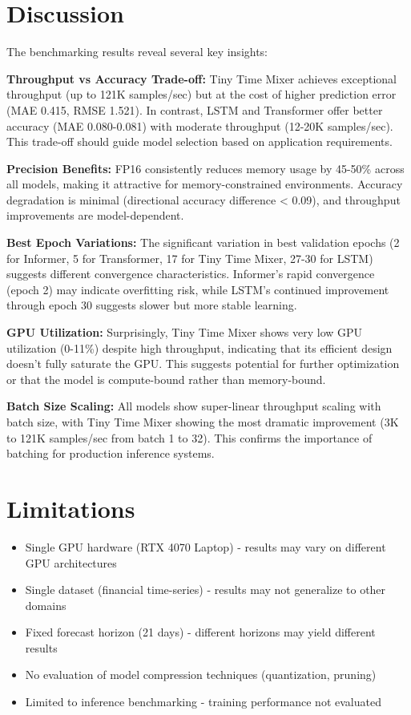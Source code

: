 \documentclass[10pt,a4paper]{article}
\begin{document}
\section{Discussion}
The benchmarking results reveal several key insights:

\textbf{Throughput vs Accuracy Trade-off:} Tiny Time Mixer achieves exceptional throughput (up to 121K samples/sec) but at the cost of higher prediction error (MAE 0.415, RMSE 1.521). In contrast, LSTM and Transformer offer better accuracy (MAE 0.080-0.081) with moderate throughput (12-20K samples/sec). This trade-off should guide model selection based on application requirements.

\textbf{Precision Benefits:} FP16 consistently reduces memory usage by 45-50\% across all models, making it attractive for memory-constrained environments. Accuracy degradation is minimal (directional accuracy difference < 0.09), and throughput improvements are model-dependent.

\textbf{Best Epoch Variations:} The significant variation in best validation epochs (2 for Informer, 5 for Transformer, 17 for Tiny Time Mixer, 27-30 for LSTM) suggests different convergence characteristics. Informer's rapid convergence (epoch 2) may indicate overfitting risk, while LSTM's continued improvement through epoch 30 suggests slower but more stable learning.

\textbf{GPU Utilization:} Surprisingly, Tiny Time Mixer shows very low GPU utilization (0-11\%) despite high throughput, indicating that its efficient design doesn't fully saturate the GPU. This suggests potential for further optimization or that the model is compute-bound rather than memory-bound.

\textbf{Batch Size Scaling:} All models show super-linear throughput scaling with batch size, with Tiny Time Mixer showing the most dramatic improvement (3K to 121K samples/sec from batch 1 to 32). This confirms the importance of batching for production inference systems.

\section{Limitations}
\begin{itemize}
    \item Single GPU hardware (RTX 4070 Laptop) - results may vary on different GPU architectures
    \item Single dataset (financial time-series) - results may not generalize to other domains
    \item Fixed forecast horizon (21 days) - different horizons may yield different results
    \item No evaluation of model compression techniques (quantization, pruning)
    \item Limited to inference benchmarking - training performance not evaluated
\end{itemize}
\end{document}

